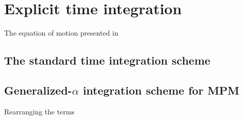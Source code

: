 \section{Explicit time integration}
\label{sec:explicit_integration}

The equation of motion presented in 

\subsection{The standard time integration scheme}
\label{sec:stand-time-integr}


\subsection{Generalized-$\alpha$ integration scheme for MPM}
\label{sec:gener-alpha-integr}

Rearranging the terms 


